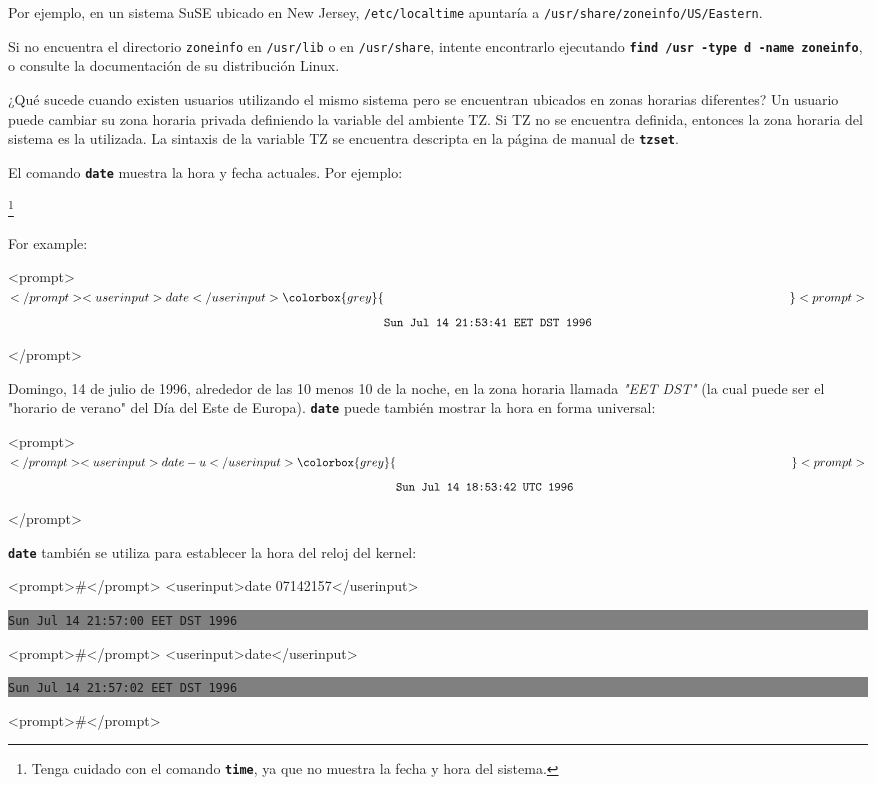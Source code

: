Por ejemplo, en un sistema SuSE ubicado en New Jersey, \texttt{/etc/localtime} apuntaría a \texttt{/usr/share/zoneinfo/US/Eastern}.



Si no encuentra el directorio \texttt{zoneinfo} en \texttt{/usr/lib} o en \texttt{/usr/share}, intente encontrarlo ejecutando
\texttt{\textbf{find /usr -type d -name zoneinfo}}, o consulte la documentación de su distribución Linux.



¿Qué sucede cuando existen usuarios utilizando el mismo sistema pero se encuentran ubicados en
zonas horarias diferentes?
Un usuario puede cambiar su zona horaria privada definiendo la variable del ambiente TZ.
Si TZ no se encuentra definida, entonces la zona horaria del sistema es la utilizada.
La sintaxis de la variable TZ se encuentra descripta en la página de manual de \texttt{\textbf{tzset}}.




El comando \texttt{\textbf{date}} muestra la hora y fecha actuales. Por ejemplo:

		\footnote{Tenga cuidado con el comando \texttt{\textbf{time}},
		ya que no muestra la fecha y hora del sistema.}

	For example:


<prompt>$</prompt> <userinput>date</userinput>
\colorbox{grey}{\parbox[t]{0.95\linewidth}{ \vspace*{0.5cm} {\tt Sun Jul 14 21:53:41 EET DST 1996 } \vspace*{0.5cm} } } 
<prompt>$</prompt>


Domingo, 14 de julio de 1996, alrededor de las 10 menos 10 de la noche, en la zona horaria llamada \textit{"EET DST"}
(la cual puede ser el "horario de verano" del Día del Este de Europa).
\texttt{\textbf{date}} puede también mostrar la hora en forma universal:



<prompt>$</prompt> <userinput>date -u</userinput>
\colorbox{grey}{\parbox[t]{0.95\linewidth}{ \vspace*{0.5cm} {\tt Sun Jul 14 18:53:42 UTC 1996 } \vspace*{0.5cm} } } 
<prompt>$</prompt>


	\texttt{\textbf{date}} también se utiliza para establecer la hora del reloj del kernel:
	


<prompt>#</prompt> <userinput>date 07142157</userinput>
\colorbox{grey}{\parbox[t]{0.95\linewidth}{ \vspace*{0.5cm} {\tt Sun Jul 14 21:57:00 EET DST 1996 } \vspace*{0.5cm} } } 
<prompt>#</prompt> <userinput>date</userinput>
\colorbox{grey}{\parbox[t]{0.95\linewidth}{ \vspace*{0.5cm} {\tt Sun Jul 14 21:57:02 EET DST 1996 } \vspace*{0.5cm} } } 
<prompt>#</prompt>


